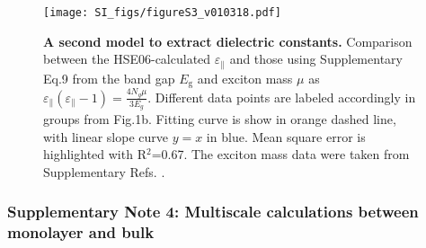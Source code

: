 \documentclass[journal=ancac3,manuscript=article,email=true,hyperref=true,keywords=true]{achemso}
\begin{document}
\begin{figure}[H]
\centering
\texttt{[image: SI\_figs/figureS3\_v010318.pdf]}
\caption{{\bf A second model to extract dielectric constants.} Comparison between the HSE06-calculated $\varepsilon_{\parallel}$ and those 
using Supplementary Eq.9 from the band gap \(E_{\mathrm{g}}\) and exciton mass \(\mu\) as 
$\varepsilon_{\parallel}(\varepsilon_{\parallel}-1)=\frac{4N_{g} \mu}{3E_g}$. 
Different data points are labeled accordingly in groups 
from Fig.1b. Fitting curve is show in orange dashed line, with linear 
slope curve $y=x$ in blue. Mean square error is highlighted with 
R$^2$=0.67. The exciton mass data were taken from Supplementary Refs. . 
}
\label{fig-S7}
\end{figure}



\subsubsection{Supplementary Note 4: Multiscale calculations between monolayer and bulk}
\end{document}
